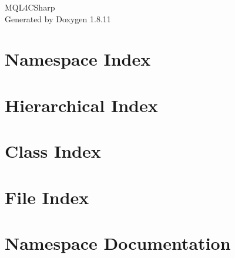 \documentclass[twoside]{book}
\newcommand{\+}{\discretionary{\mbox{\scriptsize$\hookleftarrow$}}{}{}}
\newcommand{\clearemptydoublepage}{%
  \newpage{\pagestyle{empty}\cleardoublepage}%
}
\begin{document}
\hypersetup{pageanchor=false,
             bookmarksnumbered=true,
             pdfencoding=unicode
            }
\begin{titlepage}
\vspace*{7cm}
\begin{center}%
{\Large M\+Q\+L4\+C\+Sharp }\\
\vspace*{1cm}
{\large Generated by Doxygen 1.8.11}\\
\end{center}
\end{titlepage}
\clearemptydoublepage
\tableofcontents
\clearemptydoublepage
{}
\hypersetup{pageanchor=true}

\chapter{Namespace Index}

\chapter{Hierarchical Index}

\chapter{Class Index}

\chapter{File Index}

\chapter{Namespace Documentation}




















\end{document}
